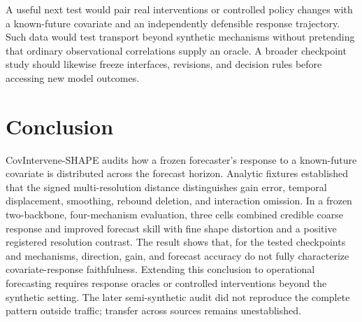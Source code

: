 \documentclass[conference]{IEEEtran}
\begin{document}
A useful next test would pair real interventions or controlled policy changes with a
known-future covariate and an independently defensible response trajectory. Such data
would test transport beyond synthetic mechanisms without pretending that ordinary
observational correlations supply an oracle. A broader checkpoint study should
likewise freeze interfaces, revisions, and decision rules before accessing new model
outcomes.

\section{Conclusion}
CovIntervene-SHAPE audits how a frozen forecaster's response to a known-future
covariate is distributed across the forecast horizon. Analytic fixtures established
that the signed multi-resolution distance distinguishes gain error, temporal
displacement, smoothing, rebound deletion, and interaction omission. In a frozen
two-backbone, four-mechanism evaluation, three cells combined credible coarse response
and improved forecast skill with fine shape distortion and a positive registered
resolution contrast. The result shows that, for the tested checkpoints and mechanisms,
direction, gain, and forecast accuracy do not fully characterize covariate-response
faithfulness. Extending this conclusion to operational forecasting requires response
oracles or controlled interventions beyond the synthetic setting. The later
semi-synthetic audit did not reproduce the complete pattern outside traffic;
transfer across sources remains unestablished.



\end{document}
